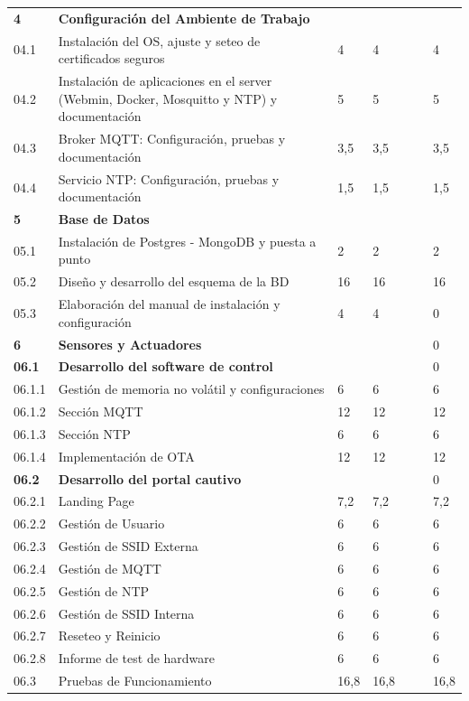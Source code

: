 \documentclass[11pt]{charter}
\begin{document}
\begin{landscape}
\begin{tabularx}{\linewidth}{@{}|p{1.5cm}|p{13cm}|p{1.5cm}|p{1.5cm}|p{1.5cm}|p{1.5cm}|p{1.5cm}|@{}}
\textbf{4} & \textbf{Configuración del Ambiente de   Trabajo} &  &  &  &  &  \\
04.1 & Instalación del OS, ajuste y seteo de   certificados seguros & 4 & 4 &  &  & 4 \\
04.2 & Instalación de aplicaciones en el server   (Webmin, Docker, Mosquitto y NTP) y documentación & 5 & 5 &  &  & 5 \\
04.3 & Broker MQTT: Configuración, pruebas y   documentación & 3,5 & 3,5 &  &  & 3,5 \\
04.4 & Servicio NTP: Configuración, pruebas y   documentación & 1,5 & 1,5 &  &  & 1,5 \\
\textbf{5} & \textbf{Base de Datos} & \textbf{} & \textbf{} &  &  & \textbf{} \\
05.1 & Instalación de Postgres - MongoDB y puesta a   punto & 2 & 2 &  &  & 2 \\
05.2 & Diseño y desarrollo del esquema de la BD & 16 & 16 &  &  & 16 \\
05.3 & Elaboración del manual de instalación y   configuración & 4 & 4 &  &  & 0 \\
\textbf{6} & \textbf{Sensores y Actuadores} &  &  &  &  & 0 \\
\textbf{06.1} & \textbf{Desarrollo del software de control} &  &  &  &  & 0 \\
06.1.1 & Gestión de memoria no volátil   y configuraciones & 6 & 6 &  &  & 6 \\
06.1.2 & Sección MQTT & 12 & 12 &  &  & 12 \\
06.1.3 & Sección NTP & 6 & 6 &  &  & 6 \\
06.1.4 & Implementación de OTA & 12 & 12 &  &  & 12 \\
\textbf{06.2} & \textbf{Desarrollo del portal cautivo} &  &  &  &  & 0 \\
06.2.1 & Landing Page & 7,2 & 7,2 &  &  & 7,2 \\
06.2.2 & Gestión de Usuario & 6 & 6 &  &  & 6 \\
06.2.3 & Gestión de SSID Externa & 6 & 6 &  &  & 6 \\
06.2.4 & Gestión de MQTT & 6 & 6 &  &  & 6 \\
06.2.5 & Gestión de NTP & 6 & 6 &  &  & 6 \\
06.2.6 & Gestión de SSID Interna & 6 & 6 &  &  & 6 \\
06.2.7 & Reseteo y Reinicio & 6 & 6 &  &  & 6 \\
06.2.8 & Informe de test de hardware & 6 & 6 &  &  & 6 \\
06.3 & Pruebas de Funcionamiento & 16,8 & 16,8 &  &  & 16,8 \\

\end{tabularx}
\end{landscape}
\end{document}

